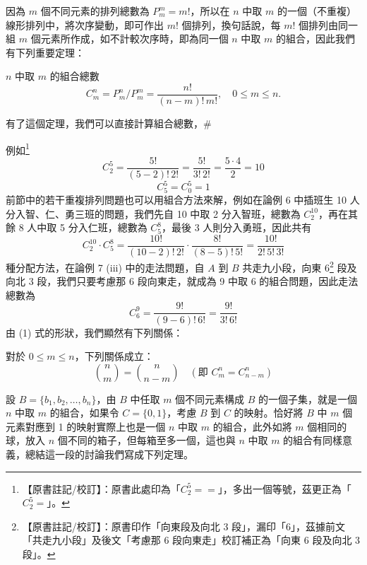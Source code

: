 因為 $m$ 個不同元素的排列總數為 $P_m^m = m!$，所以在 $n$ 中取 $m$ 的一個（不重複）線形排列中，將次序變動，即可作出 $m!$ 個排列，換句話說，每 $m!$ 個排列由同一組 $m$ 個元素所作成，如不計較次序時，即為同一個 $n$ 中取 $m$ 的組合，因此我們有下列重要定理：

\medskip
\begin{theorem}\label{thm:b5-2-7}
$n$ 中取 $m$ 的組合總數
\begin{equation}
C_m^n = P_m^n / P_m^m = \frac{n!}{(n - m)!\, m!}, \quad 0 \le m \le n. \tag{1}
\end{equation}
\end{theorem}
有了這個定理，我們可以直接計算組合總數，\hfill $\#$

\medskip
\noindent 例如\label{note:b5-ch2-p75-eq}\footnote{【原書註記/校訂】：原書此處印為「$C_2^5 ==$」，多出一個等號，茲更正為「$C_2^5 =$」。}
\[
C_2^5 = \frac{5!}{(5 - 2)!\, 2!} = \frac{5!}{3!\, 2!} = \frac{5 \cdot 4}{2} = 10
\]
\[
C_5^5 = C_0^5 = 1
\]
前節中的若干重複排列問題也可以用組合方法來解，例如在論例 6 中插班生 10 人分入智、仁、勇三班的問題，我們先自 10 中取 2 分入智班，總數為 $C_2^{10}$，再在其餘 8 人中取 5 分入仁班，總數為 $C_5^8$，最後 3 人則分入勇班，因此共有
\[
C_2^{10} \cdot C_5^8 = \frac{10!}{(10 - 2)!\, 2!} \cdot \frac{8!}{(8 - 5)!\, 5!} = \frac{10!}{2!\, 5!\, 3!}
\]
種分配方法，在論例 7 (iii) 中的走法問題，自 $A$ 到 $B$ 共走九小段，向東 6\label{note:b5-ch2-p76-east6}\footnote{【原書註記/校訂】：原書印作「向東段及向北 3 段」，漏印「6」，茲據前文「共走九小段」及後文「考慮那 6 段向東走」校訂補正為「向東 6 段及向北 3 段」。} 段及向北 3 段，我們只要考慮那 6 段向東走，就成為 9 中取 6 的組合問題，因此走法總數為
\[
C_6^9 = \frac{9!}{(9 - 6)!\, 6!} = \frac{9!}{3!\, 6!}
\]
由 (1) 式的形狀，我們顯然有下列關係：

\medskip
\begin{corollary*}
對於 $0 \le m \le n$，下列關係成立：
\begin{equation}
\binom{n}{m} = \binom{n}{n - m} \quad (\text{即 } C_m^n = C_{n-m}^n) \tag{2}
\end{equation}
\end{corollary*}

設 $B = \{b_1, b_2, \ldots, b_n\}$，由 $B$ 中任取 $m$ 個不同元素構成 $B$ 的一個子集，就是一個 $n$ 中取 $m$ 的組合，如果令 $C = \{0, 1\}$，考慮 $B$ 到 $C$ 的映射。恰好將 $B$ 中 $m$ 個元素對應到 1 的映射實際上也是一個 $n$ 中取 $m$ 的組合，此外如將 $m$ 個相同的球，放入 $n$ 個不同的箱子，但每箱至多一個，這也與 $n$ 中取 $m$ 的組合有同樣意義，總結這一段的討論我們寫成下列定理。

